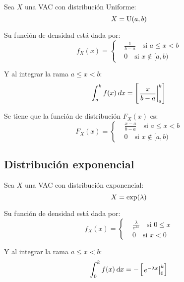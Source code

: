 \documentclass[a5paper,12pt,twoside]{book}
\begin{document}
Sea $X$ una VAC con distribución Uniforme:
\begin{equation*}
    X = \operatorname{U}(a,b)
\end{equation*}

Su función de densidad está dada por:
\begin{equation*}
    f_X(x) =
    \left\{
    \begin{aligned}
        & \frac{1}{b-a} \quad \text{si } a \leq x < b
        \\[1ex]
        & 0 \quad \text{si } x \notin [a,b)
    \end{aligned}
    \right.
\end{equation*}

Y al integrar la rama $a \leq x < b$:
\begin{equation*}
    \int_a^k f(x) \, \textsl{d} x = \begin{bmatrix} \left. \dfrac{x}{b-a} \right|_{a}^{k} \end{bmatrix}
\end{equation*}

Se tiene que la función de distribución $F_X(x)$ es:
\begin{equation*}
    F_X(x) =
    \left\{
    \begin{aligned}
        & \frac{x-a}{b-a} \quad \text{si } a \leq x < b
        \\
        & 0 \quad \text{si } x \notin [a,b)
    \end{aligned}
    \right.
\end{equation*}


\subsection{Distribución exponencial}

Sea $X$ una VAC con distribución exponencial:
\begin{equation*}
    X = \operatorname{exp}(\lambda)
\end{equation*}

Su función de densidad está dada por:
\begin{equation*}
    f_X(x) =
    \left\{
    \begin{aligned}
        & \frac{\lambda}{e^{\lambda x}} \quad \text{si } 0 \leq x
        \\[1ex]
        & 0 \quad \text{si } x < 0
    \end{aligned}
    \right.
\end{equation*}

Y al integrar la rama $a \leq x < b$:
\begin{equation*}
    \int_0^k f(x) \, \textsl{d} x = -\begin{bmatrix} \left. e^{-\lambda x} \right|_{0}^{k} \end{bmatrix}
\end{equation*}
\end{document}
